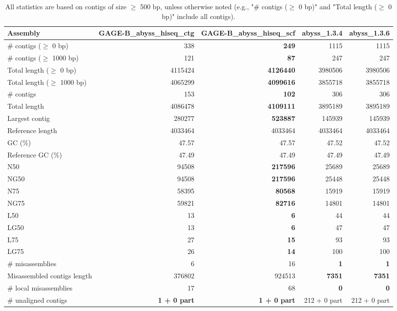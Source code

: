 \documentclass[12pt,a4paper]{article}
\begin{document}
\begin{table}[ht]
\begin{center}
\caption{All statistics are based on contigs of size $\geq$ 500 bp, unless otherwise noted (e.g., "\# contigs ($\geq$ 0 bp)" and "Total length ($\geq$ 0 bp)" include all contigs).}
\begin{tabular}{|l*{4}{|r}|}
\hline
Assembly & GAGE-B\_abyss\_hiseq\_ctg & GAGE-B\_abyss\_hiseq\_scf & abyss\_1.3.4 & abyss\_1.3.6 \\ \hline
\# contigs ($\geq$ 0 bp) & 338 & {\bf 249} & 1115 & 1115 \\ \hline
\# contigs ($\geq$ 1000 bp) & 121 & {\bf 87} & 247 & 247 \\ \hline
Total length ($\geq$ 0 bp) & 4115424 & {\bf 4126440} & 3980506 & 3980506 \\ \hline
Total length ($\geq$ 1000 bp) & 4065299 & {\bf 4099616} & 3855718 & 3855718 \\ \hline
\# contigs & 153 & {\bf 102} & 306 & 306 \\ \hline
Total length & 4086478 & {\bf 4109111} & 3895189 & 3895189 \\ \hline
Largest contig & 280277 & {\bf 523887} & 145939 & 145939 \\ \hline
Reference length & 4033464 & 4033464 & 4033464 & 4033464 \\ \hline
GC (\%) & 47.57 & 47.57 & 47.52 & 47.52 \\ \hline
Reference GC (\%) & 47.49 & 47.49 & 47.49 & 47.49 \\ \hline
N50 & 94508 & {\bf 217596} & 25689 & 25689 \\ \hline
NG50 & 94508 & {\bf 217596} & 25448 & 25448 \\ \hline
N75 & 58395 & {\bf 80568} & 15919 & 15919 \\ \hline
NG75 & 59821 & {\bf 82716} & 14801 & 14801 \\ \hline
L50 & 13 & {\bf 6} & 44 & 44 \\ \hline
LG50 & 13 & {\bf 6} & 47 & 47 \\ \hline
L75 & 27 & {\bf 15} & 93 & 93 \\ \hline
LG75 & 26 & {\bf 14} & 100 & 100 \\ \hline
\# misassemblies & 6 & 16 & {\bf 1} & {\bf 1} \\ \hline
Misassembled contigs length & 376802 & 924513 & {\bf 7351} & {\bf 7351} \\ \hline
\# local misassemblies & 17 & 68 & {\bf 0} & {\bf 0} \\ \hline
\# unaligned contigs & {\bf 1 + 0 part} & {\bf 1 + 0 part} & 212 + 0 part & 212 + 0 part \\ \hline

\end{tabular}
\end{center}
\end{table}
\end{document}
